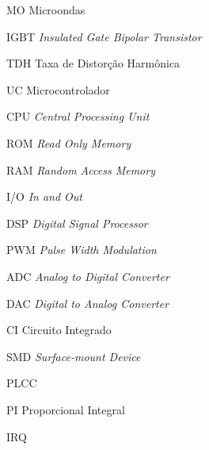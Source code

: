 
\begin{siglas}
    \item[MO] Microondas
    \item[IGBT] \textit{Insulated Gate Bipolar Transistor}
    \item[TDH] Taxa de Distorção Harmônica
    \item[UC] Microcontrolador
    \item[CPU] \textit{Central Processing Unit}
    \item[ROM] \textit{Read Only Memory}
    \item[RAM] \textit{Random Access Memory}
    \item[I/O] \textit{In and Out}
    \item[DSP] \textit{Digital Signal Processor}
    \item[PWM] \textit{Pulse Width Modulation}
    \item[ADC] \textit{Analog to Digital Converter}
    \item[DAC] \textit{Digital to Analog Converter}
    \item[CI] Circuito Integrado
    \item[SMD] \textit{Surface-mount Device}
    \item[PLCC] 
    \item{PI} Proporcional Integral
    \item[IRQ] 
\end{siglas}

